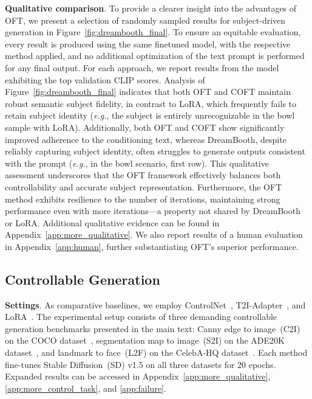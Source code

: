 \textbf{Qualitative comparison}. To provide a clearer insight into the advantages of OFT, we present a selection of randomly sampled results for subject-driven generation in Figure~\ref{fig:dreambooth_final}. To ensure an equitable evaluation, every result is produced using the same finetuned model, with the respective method applied, and no additional optimization of the text prompt is performed for any final output. For each approach, we report results from the model exhibiting the top validation CLIP scores. Analysis of Figure~\ref{fig:dreambooth_final} indicates that both OFT and COFT maintain robust semantic subject fidelity, in contrast to LoRA, which frequently fails to retain subject identity (\emph{e.g.}, the subject is entirely unrecognizable in the bowl sample with LoRA). Additionally, both OFT and COFT show significantly improved adherence to the conditioning text, whereas DreamBooth, despite reliably capturing subject identity, often struggles to generate outputs consistent with the prompt (\emph{e.g.}, in the bowl scenario, first row). This qualitative assessment underscores that the OFT framework effectively balances both controllability and accurate subject representation. Furthermore, the OFT method exhibits resilience to the number of iterations, maintaining strong performance even with more iterations—a property not shared by DreamBooth or LoRA. Additional qualitative evidence can be found in Appendix~\ref{app:more_qualitative}. We also report results of a human evaluation in Appendix~\ref{app:human}, further substantiating OFT’s superior performance.

\subsection{Controllable Generation}

\textbf{Settings}. As comparative baselines, we employ ControlNet~\cite{zhang2023adding}, T2I-Adapter~\cite{mou2023t2i}, and LoRA~\cite{hulora2022}. The experimental setup consists of three demanding controllable generation benchmarks presented in the main text: Canny edge to image~(C2I) on the COCO dataset~\cite{lin2014microsoft}, segmentation map to image~(S2I) on the ADE20K dataset~\cite{zhou2017scene}, and landmark to face~(L2F) on the CelebA-HQ dataset~\cite{karras2018progressive,xia2021tedigan}. Each method fine-tunes Stable Diffusion~(SD) v1.5 on all three datasets for 20 epochs. Expanded results can be accessed in Appendix~\ref{app:more_qualitative}, \ref{app:more_control_task}, and \ref{app:failure}.

